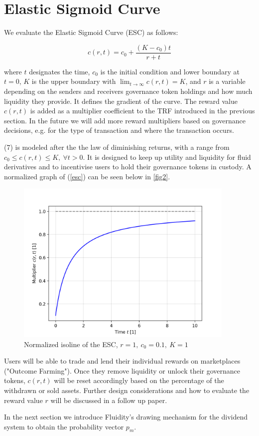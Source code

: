 \section{Elastic Sigmoid Curve}

We evaluate the Elastic Sigmoid Curve (ESC) as follows:

\begin{equation} \label{esc}
    c(r,t) = c_0 + \frac{(K-c_0)t}{r+t}
\end{equation}

where $t$ designates the time, $c_0$ is the initial condition and lower boundary at $t=0$, $K$ is the upper boundary with $\lim_{t \to \infty} c(r,t) = K$, and $r$ is a variable depending on the senders and receivers governance token holdings and how much liquidity they provide. It defines the gradient of the curve. The reward value $c(r,t)$ is added as a multiplier coefficient to the TRF introduced in the previous section. In the future we will add more reward multipliers based on governance decisions, e.g. for the type of transaction and where the transaction occurs.

(7) is modeled after the the law of diminishing returns, with a range from $c_0 \leq c(r,t) \leq K,\: \forall t > 0$. It is designed to keep up utility and liquidity for fluid derivatives and to incentivise users to hold their governance tokens in custody. A normalized graph of (\ref{esc}) can be seen below in \autoref{fig2}.

\begin{figure}[hb]
    \centering
    \includegraphics[width=10.5cm]{images/ESCnew.png}
    \caption{Normalized isoline of the ESC, $r=1,\: c_0 = 0.1,\: K=1$} \label{fig2}
\end{figure}

Users will be able to trade and lend their individual rewards on marketplaces ("Outcome Farming"). Once they remove liquidity or unlock their governance tokens, $c(r,t)$ will be reset accordingly based on the percentage of the withdrawn or sold assets. Further design considerations and how to evaluate the reward value $r$ will be discussed in a follow up paper. 

In the next section we introduce Fluidity's drawing mechanism for the dividend system to obtain the probability vector $p_m$.